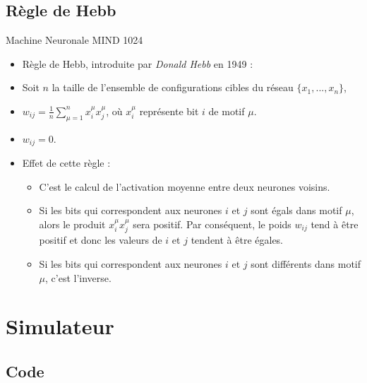 \documentclass{beamer}
\begin{document}
\subsection{Règle de Hebb}

\begin{frame}{Machine Neuronale MIND 1024}
    \begin{itemize}[<+-| alert@+>] %
        \item Règle de Hebb, introduite par \textit{Donald Hebb} en 1949 :
        \item Soit $n$ la taille de l'ensemble de configurations cibles du réseau $\{x_1, ..., x_n\}$,
        \item $w_{ij} = \frac{1}{n}\sum_{\mu=1}^{n}x_{i}^{\mu}x_{j}^{\mu}$, où $x_{i}^{\mu}$ représente bit $i$ de motif $\mu$.
        \item $w_{ij} = 0$.
        \item Effet de cette règle :
            \begin{itemize}[<+-| alert@+>] %
                \item C'est le calcul de l'activation moyenne entre deux neurones voisins.
                \item Si les bits qui correspondent aux neurones $i$ et $j$ sont égals dans motif $\mu$, alors le produit $x_{i}^{\mu}x_{j}^{\mu}$ sera positif. Par conséquent, le poids $w_{ij}$ tend à être positif et donc les valeurs de $i$ et $j$ tendent à être égales.
                \item Si les bits qui correspondent aux neurones $i$ et $j$ sont différents dans motif $\mu$, c'est l'inverse.
            \end{itemize}
    \end{itemize}
\end{frame}

\section{Simulateur}

\subsection{Code}
\end{document}

